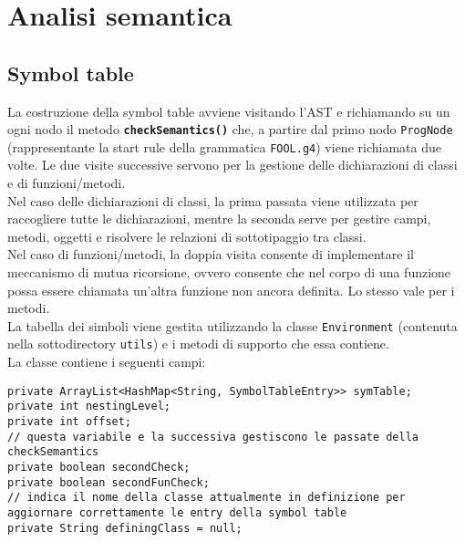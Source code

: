 \documentclass[a4paper]{article}   %
\begin{document}
\section{Analisi semantica}
\subsection{Symbol table}

La costruzione della symbol table avviene visitando l'AST e richiamando su un ogni nodo il metodo \textbf{\lstinline|checkSemantics()|} che, a partire dal primo nodo \lstinline|ProgNode| (rappresentante la start rule della grammatica \lstinline|FOOL.g4|) viene richiamata due volte. Le due visite successive servono per la gestione delle dichiarazioni di classi e di funzioni/metodi.\\
Nel caso delle dichiarazioni di classi, la prima passata viene utilizzata per raccogliere tutte le dichiarazioni, mentre la seconda serve per gestire campi, metodi, oggetti e risolvere le relazioni di sottotipaggio tra classi.\\
Nel caso di funzioni/metodi, la doppia visita consente di implementare il meccanismo di mutua ricorsione, ovvero consente che nel corpo di una funzione possa essere chiamata un'altra funzione non ancora definita. Lo stesso vale per i metodi.\\

La tabella dei simboli viene gestita utilizzando la classe \lstinline|Environment| (contenuta nella sottodirectory \lstinline|utils|) e i metodi di supporto che essa contiene.\\
La classe contiene i seguenti campi:\\

\begin{lstlisting}[basicstyle=\footnotesize\ttfamily]
private ArrayList<HashMap<String, SymbolTableEntry>> symTable;
private int nestingLevel;
private int offset;
// questa variabile e la successiva gestiscono le passate della checkSemantics
private boolean secondCheck; 
private boolean secondFunCheck;
// indica il nome della classe attualmente in definizione per aggiornare correttamente le entry della symbol table
private String definingClass = null; 
\end{lstlisting}
\end{document}
